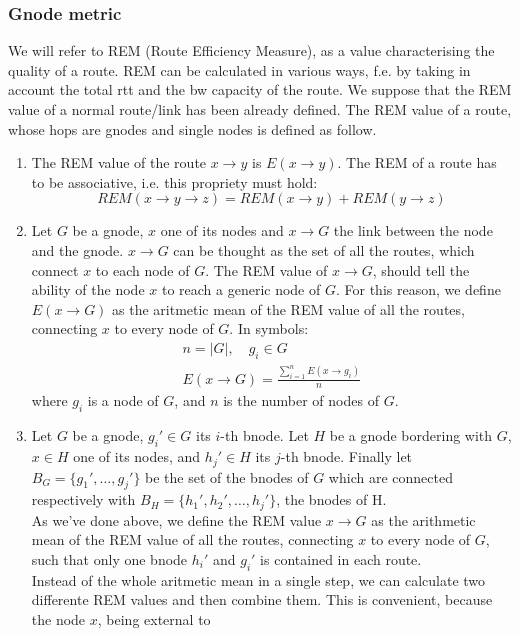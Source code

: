 \documentclass[a4paper]{article}
\begin{document}
\subsubsection{Gnode metric}
We will refer to REM (Route Efficiency Measure), as a value characterising the
quality of a route. REM can be calculated in various ways, f.e. by taking in
account the total rtt and the bw capacity of the route. We suppose that
the REM value of a normal route/link has been already defined. The REM value
of a route, whose hops are gnodes and single nodes is defined as follow.
\begin{enumerate}
	\item The REM value of the route $x\rightarrow y$ is $E(x\rightarrow
		y)$. The REM of a route has to be associative, i.e. this
		propriety must hold:
		\[
		REM(x\rightarrow y\rightarrow z)=REM(x\rightarrow
		y)+REM(y\rightarrow z)
		\]
	\item Let $G$ be a gnode, $x$ one of its nodes and $x \rightarrow G$ the
		link between the node and the gnode. $x \rightarrow G$ can be
		thought as the set of all the routes, which connect $x$ to
		each node of $G$. The REM value of $x \rightarrow G$, should
		tell the ability of the node $x$ to reach a generic node of
		$G$. For this reason, we define $E(x \rightarrow G)$ as the
		aritmetic mean of the REM value of all the routes, connecting
		$x$ to every node of $G$. In symbols:
		\[
		\begin{matrix}
			n=|G|,\quad g_i\in G\\
		E(x\rightarrow G)=\frac{\sum_{i=1}^n E(x \rightarrow g_i)}{n}
		\end{matrix}
		\]
		where $g_i$ is a node of $G$, and $n$ is the number of nodes
		of $G$.
	\item Let $G$ be a gnode, $g_i' \in G$ its $i$-th bnode. Let $H$ be a
		gnode bordering with $G$, $x \in H$ one of its nodes, and
		$h_j' \in H$ its $j$-th bnode. Finally let
		$B_G=\{g_1',\dots,g_j'\}$ be the set of the bnodes of $G$ which
		are connected respectively with $B_H=\{h_1', h_2',
		\dots,h_j'\}$, the bnodes of H.\\
		As we've done above, we define the REM value $x\rightarrow G$
		as the arithmetic mean of the REM value of all the routes, connecting
		$x$ to every node of $G$, such that only one bnode $h_i'$ and
		$g_i'$ is contained in each route.\\
		Instead of the whole aritmetic mean in a single step, we can
		calculate two differente REM values and then combine them.
		This is convenient, because the node $x$, being external to

\end{enumerate}
\end{document}
